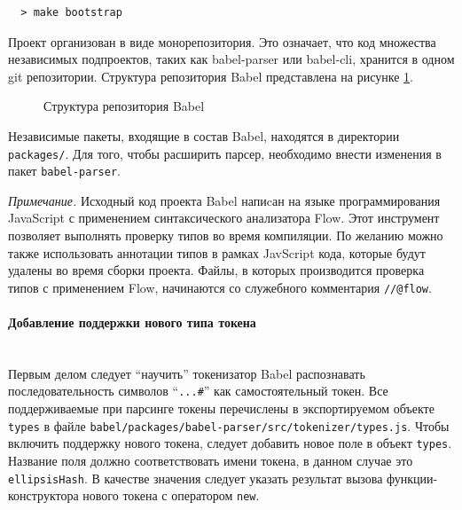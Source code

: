 \documentclass[14pt, a4paper]{article}
\def\code#1{\texttt{#1}} %
\begin{document}
\begin{lstlisting}
  > make bootstrap
\end{lstlisting}

Проект организован в виде монорепозитория. Это означает, что код множества независимых подпроектов,
таких как babel-parser или babel-cli, хранится в одном git репозитории. Структура репозитория Babel
представлена на рисунке \ref{babel_dirs}.

\begin{figure}[H]
  \centering
  \caption{Структура репозитория Babel}
  \label{babel_dirs}
\end{figure}


Независимые пакеты, входящие в состав Babel, находятся в директории \code{packages/}. Для того, чтобы
расширить парсер, необходимо внести изменения в пакет \code{babel-parser}.

\textit{Примечание.} Исходный код проекта Babel напиcан на языке программирования JavaScript с
применением синтаксического анализатора Flow. Этот инструмент позволяет выполнять проверку типов во
время компиляции. По желанию можно также использовать аннотации типов в рамках JavScript кода, которые
будут удалены во время сборки проекта. Файлы, в которых производится проверка типов с применением Flow,
начинаются со служебного комментария \code{//@flow}.

\paragraph{Добавление поддержки нового типа токена} \mbox{}\\

Первым делом следует ``научить'' токенизатор Babel распознавать последовательность символов ``\code{...\#}''
как самостоятельный токен. Все поддерживаемые при парсинге токены перечислены в экспортируемом объекте
\code{types} в файле \code{babel/packages/babel-parser/src/tokenizer/types.js}. Чтобы включить поддержку нового токена,
следует добавить новое поле в объект \code{types}. Название поля должно соответствовать имени токена, в данном случае это \code{ellipsisHash}.
В качестве значения следует указать результат вызова функции-конструктора нового токена с оператором \code{new}.
\end{document}
